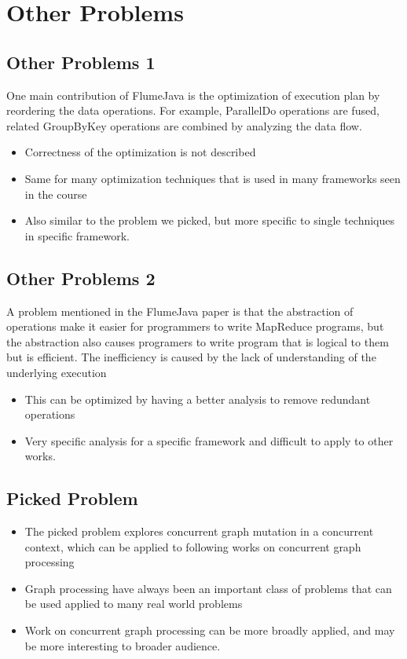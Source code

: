 \section{Other Problems}
\subsection{Other Problems 1}
\begin{frame}
One main contribution of FlumeJava is the optimization of execution plan by
reordering the data operations. For example, ParallelDo operations are fused,
related GroupByKey operations are combined by analyzing the data flow.
\begin{itemize}
  \item Correctness of the optimization is not described
  \item Same for many optimization techniques that is used in many frameworks
  seen in the course
  \item Also similar to the problem we picked, but more specific to single
  techniques in specific framework.
\end{itemize}
\end{frame}

\subsection{Other Problems 2}
\begin{frame}
A problem mentioned in the FlumeJava paper is that the abstraction of
operations make it easier for programmers to write MapReduce programs, but the
abstraction also causes programers to write program that is logical to them but
is efficient. The inefficiency is caused by the lack of understanding of the
underlying execution
\begin{itemize}
  \item This can be optimized by having a better analysis to remove redundant
  operations
  \item Very specific analysis for a specific framework and difficult to apply
  to other works.
\end{itemize}
\end{frame}

\subsection{Picked Problem}
\begin{frame}
\begin{itemize}
  \item The picked problem explores concurrent graph mutation in a concurrent context,
which can be applied to following works on concurrent graph processing
  \item Graph processing have always been an important class of problems that
  can be used applied to many real world problems
  \item Work on concurrent graph processing can be more broadly applied, and may
  be more interesting to broader audience.
\end{itemize}
\end{frame}